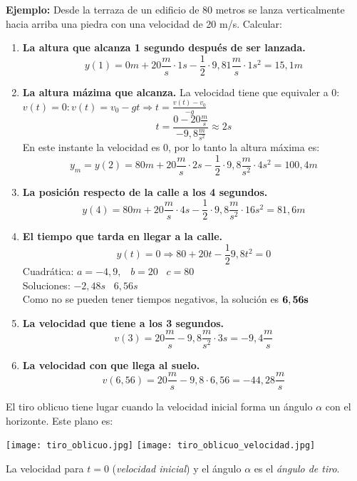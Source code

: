 \textbf{Ejemplo:} Desde la terraza de un edificio de 80 metros se lanza verticalmente hacia arriba una piedra con una velocidad de 20 m/s. Calcular:
\begin{enumerate}
    \item \textbf{La altura que alcanza 1 segundo después de ser lanzada.}
    $$y(1) = 0m + 20\frac{m}{s} \cdot 1s - \frac{1}{2} \cdot 9,81\frac{m}{s} \cdot 1 s^2 = 15,1 m$$
    \item \textbf{La altura mázima que alcanza.}
    La velocidad tiene que equivaler a 0: $v(t) = 0 : v(t) = v_0 -gt \Rightarrow t = \frac{v(t)-v_0}{-g}$
    $$t =  \frac{0 - 20\frac{m}{s}}{-9,8 \frac{m}{s^2}} \approx 2s$$
    En este instante la velocidad es 0, por lo tanto la altura máxima es:
    $$y_m = y(2) = 80m + 20\frac{m}{s} \cdot 2s - \frac{1}{2} \cdot 9,8\frac{m}{s^2} \cdot 4s^2 = 100,4m$$
    \item \textbf{La posición respecto de la calle a los 4 segundos.}
    $$y(4) = 80m + 20\frac{m}{s} \cdot 4s - \frac{1}{2} \cdot 9,8\frac{m}{s^2} \cdot 16s^2 = 81,6m$$
    \item \textbf{El tiempo que tarda en llegar a la calle.}
    $$y(t) = 0 \Rightarrow 80+20t-\frac{1}{2}9,8t^2 = 0$$
    Cuadrática: $a = -4,9, \;\;\; b = 20 \;\;\; c = 80$\\
    Soluciones: $-2,48s \;\;\; 6,56s$\\
    Como no se pueden tener tiempos negativos, la solución es $\bf 6,56s$
    \item \textbf{La velocidad que tiene a los 3 segundos.}
    $$v(3) = 20\frac{m}{s} - 9,8\frac{m}{s^2} \cdot 3s = -9,4 \frac{m}{s}$$
    \item \textbf{La velocidad con que llega al suelo.}
    $$v(6,56) = 20\frac{m}{s} - 9,8 \cdot 6,56 = -44,28\frac{m}{s}$$
\end{enumerate}
El tiro oblicuo tiene lugar cuando la velocidad inicial forma un ángulo $\alpha$ con el horizonte. Este plano es:
\begin{center}
    \texttt{[image: tiro\_oblicuo.jpg]}
    \texttt{[image: tiro\_oblicuo\_velocidad.jpg]}
\end{center}
La velocidad para $t = 0$ (\emph{velocidad inicial}) y el ángulo $\alpha$ es el \emph{ángulo de tiro}.\\
